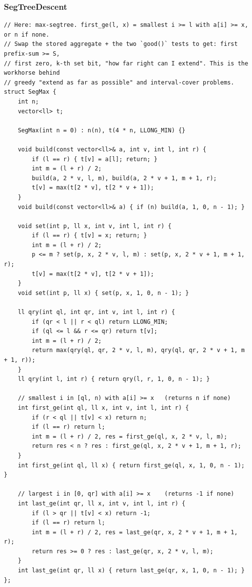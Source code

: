 \documentclass[9pt,a4paper,twocolumn]{extarticle}
\begin{document}
\subsubsection{SegTreeDescent}
\nopagebreak
\begin{lstlisting}
// Here: max-segtree. first_ge(l, x) = smallest i >= l with a[i] >= x, or n if none.
// Swap the stored aggregate + the two `good()` tests to get: first prefix-sum >= S,
// first zero, k-th set bit, "how far right can I extend". This is the workhorse behind
// greedy "extend as far as possible" and interval-cover problems.
struct SegMax {
    int n;
    vector<ll> t;

    SegMax(int n = 0) : n(n), t(4 * n, LLONG_MIN) {}

    void build(const vector<ll>& a, int v, int l, int r) {
        if (l == r) { t[v] = a[l]; return; }
        int m = (l + r) / 2;
        build(a, 2 * v, l, m), build(a, 2 * v + 1, m + 1, r);
        t[v] = max(t[2 * v], t[2 * v + 1]);
    }
    void build(const vector<ll>& a) { if (n) build(a, 1, 0, n - 1); }

    void set(int p, ll x, int v, int l, int r) {
        if (l == r) { t[v] = x; return; }
        int m = (l + r) / 2;
        p <= m ? set(p, x, 2 * v, l, m) : set(p, x, 2 * v + 1, m + 1, r);
        t[v] = max(t[2 * v], t[2 * v + 1]);
    }
    void set(int p, ll x) { set(p, x, 1, 0, n - 1); }

    ll qry(int ql, int qr, int v, int l, int r) {
        if (qr < l || r < ql) return LLONG_MIN;
        if (ql <= l && r <= qr) return t[v];
        int m = (l + r) / 2;
        return max(qry(ql, qr, 2 * v, l, m), qry(ql, qr, 2 * v + 1, m + 1, r));
    }
    ll qry(int l, int r) { return qry(l, r, 1, 0, n - 1); }

    // smallest i in [ql, n) with a[i] >= x   (returns n if none)
    int first_ge(int ql, ll x, int v, int l, int r) {
        if (r < ql || t[v] < x) return n;
        if (l == r) return l;
        int m = (l + r) / 2, res = first_ge(ql, x, 2 * v, l, m);
        return res < n ? res : first_ge(ql, x, 2 * v + 1, m + 1, r);
    }
    int first_ge(int ql, ll x) { return first_ge(ql, x, 1, 0, n - 1); }

    // largest i in [0, qr] with a[i] >= x    (returns -1 if none)
    int last_ge(int qr, ll x, int v, int l, int r) {
        if (l > qr || t[v] < x) return -1;
        if (l == r) return l;
        int m = (l + r) / 2, res = last_ge(qr, x, 2 * v + 1, m + 1, r);
        return res >= 0 ? res : last_ge(qr, x, 2 * v, l, m);
    }
    int last_ge(int qr, ll x) { return last_ge(qr, x, 1, 0, n - 1); }
};
\end{lstlisting}
\end{document}
